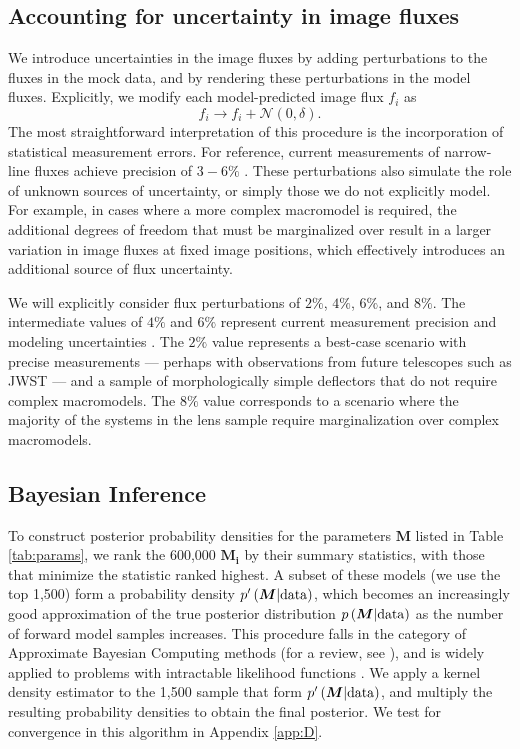 \subsection{Accounting for uncertainty in image fluxes}
\label{ssec:fluxdelta}
We introduce uncertainties in the image fluxes by adding perturbations to the fluxes in the mock data, and by rendering these perturbations in the model fluxes. Explicitly, we modify each model-predicted image flux $f_i$ as
\begin{equation}
f_i \rightarrow f_i + \mathcal{N} \left(0, \delta \right).
\end{equation} 
The most straightforward interpretation of this procedure is the incorporation of statistical measurement errors. For reference, current measurements of narrow-line fluxes achieve precision of $3-6 \%$ \citep{Nierenberg++14,Nierenberg++17}. These perturbations also simulate the role of unknown sources of uncertainty, or simply those we do not explicitly model. For example, in cases where a more complex macromodel is required, the additional degrees of freedom that must be marginalized over result in a larger variation in image fluxes at fixed image positions, which effectively introduces an additional source of flux uncertainty. 

We will explicitly consider flux perturbations of $2\%$, $4\%$, $6\%$, and $8\%$. The intermediate values of $4\%$ and $6\%$ represent current measurement precision \citep{Nierenberg++17} and modeling uncertainties \citep{Gilman++17}. The $2\%$ value represents a best-case scenario with precise measurements --- perhaps with observations from future telescopes such as JWST --- and a sample of morphologically simple deflectors that do not require complex macromodels. The $8\%$ value corresponds to a scenario where the majority of the systems in the lens sample require marginalization over complex macromodels.  

\subsection{Bayesian Inference}
\label{ssec:forwardmodeling}
To construct posterior probability densities for the parameters $\boldsymbol{M}$ listed in Table \ref{tab:params}, we rank the 600,000 $\boldsymbol{M_i}$ by their summary statistics, with those that minimize the statistic ranked highest. A subset of these models (we use the top 1,500) form a probability density $p^{\prime}\left(\boldsymbol{M} | \rm{data}\right)$, which becomes an increasingly good approximation of the true posterior distribution $p\left(\boldsymbol{M} | \rm{data}\right)$ as the number of forward model samples increases. This procedure falls in the category of Approximate Bayesian Computing methods (for a review, see \citep{Lintusaari++17}), and is widely applied to problems with intractable likelihood functions \citep{Akeret++15,Hahn++17,Birrer++17a,Davies++18}. We apply a kernel density estimator to the 1,500 sample that form $p^{\prime}\left(\boldsymbol{M} | \rm{data}\right)$, and multiply the resulting probability densities to obtain the final posterior. We test for convergence in this algorithm in Appendix \ref{app:D}. 

